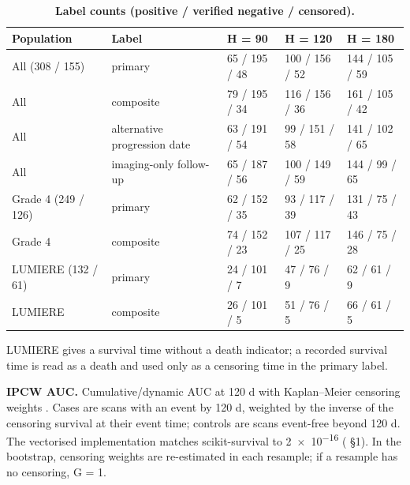 \documentclass[11pt,a4paper]{article}
\begin{document}
\begin{table}[H]
\centering
\small
\renewcommand{\thetable}{S4}\renewcommand{\theHtable}{S4}
\caption{\textbf{Label counts (positive / verified negative / censored).}}
\label{tab:S4}
\begin{tabularx}{\linewidth}{@{}R{3.42cm} L R{2.38cm} R{2.55cm} R{2.55cm}@{}}
\toprule
Population & Label & H = 90 & H = 120 & H = 180 \\
\midrule
All (308 / 155) & primary & 65 / 195 / 48 & 100 / 156 / 52 & 144 / 105 / 59 \\
All & composite & 79 / 195 / 34 & 116 / 156 / 36 & 161 / 105 / 42 \\
All & alternative progression date & 63 / 191 / 54 & 99 / 151 / 58 & 141 / 102 / 65 \\
All & imaging-only follow-up & 65 / 187 / 56 & 100 / 149 / 59 & 144 / 99 / 65 \\
Grade 4 (249 / 126) & primary & 62 / 152 / 35 & 93 / 117 / 39 & 131 / 75 / 43 \\
Grade 4 & composite & 74 / 152 / 23 & 107 / 117 / 25 & 146 / 75 / 28 \\
LUMIERE (132 / 61) & primary & 24 / 101 / 7 & 47 / 76 / 9 & 62 / 61 / 9 \\
LUMIERE & composite & 26 / 101 / 5 & 51 / 76 / 5 & 66 / 61 / 5 \\
\bottomrule
\end{tabularx}
\end{table}

LUMIERE gives a survival time without a death indicator; a recorded survival time is read as a death and used
only as a censoring time in the primary label.

\textbf{IPCW AUC.} Cumulative/dynamic AUC at 120 d with Kaplan--Meier censoring weights
\citep{uno2007,blanche2013}. Cases are scans with an event by 120 d, weighted by the inverse of the censoring
survival at their event time; controls are scans event-free beyond 120 d. The vectorised implementation
matches scikit-survival to \num{2e-16} ( \S{}1). In the bootstrap, censoring
weights are re-estimated in each resample; if a resample has no censoring, G = 1.
\end{document}
